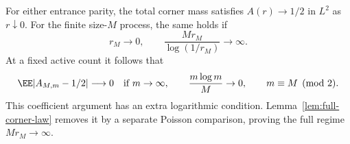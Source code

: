 \documentclass[11pt,letterpaper]{article}
\begin{document}
\begin{lemma}
\label{lem:corner-mass-law}
For either entrance parity, the total corner mass satisfies
$A(r)\to1/2$ in $L^2$ as $r\downarrow0$.
For the finite size-$M$ process, the same holds if
\begin{equation}\label{eq:marked-cutoff-regime}
 r_M\to0,\qquad \frac{Mr_M}{\log(1/r_M)}\longrightarrow\infty.
\end{equation}
At a fixed active count it follows that
\begin{equation}\label{eq:corner-at-count}
 \EE|A_{M,m}-1/2|\longrightarrow0
 \quad\hbox{if }m\to\infty,\qquad \frac{m\log m}{M}\to0,
 \qquad m\equiv M\pmod2.
\end{equation}
This coefficient argument has an extra logarithmic condition.
Lemma~\ref{lem:full-corner-law} removes it by a separate Poisson
comparison, proving the full regime $Mr_M\to\infty$.
\end{lemma}
\end{document}
